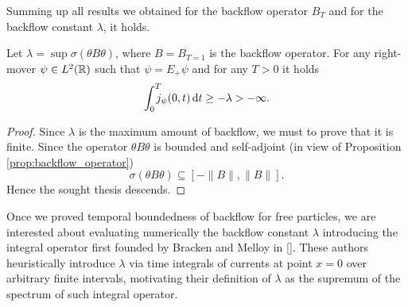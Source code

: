 Summing up all results we obtained for the backflow operator $B_T$ and for the backflow constant $\lambda$, it holds.

\begin{theorem}
	\label{th:temp_bound}
	Let $\lambda=\sup \sigma(\theta B\theta)$, where $B=B_{T=1}$ is the backflow operator. For any right-mover $\psi\in L^2({\mathbb R})$ such that $\psi=E_+\psi$ and for any $T>0$ it holds 
	\begin{equation}
		\int_{0}^{T}\!\!\!\!j_\psi(0,t)\, \mathrm d t\ge -\lambda>-\infty.
	\end{equation}
\end{theorem}
\begin{proof}
	Since $\lambda$ is the maximum amount of backflow, we must to prove that it is finite. Since the operator $\theta B\theta$ is bounded and self-adjoint (in view of Proposition \ref{prop:backflow_operator})
	\begin{equation}
		\sigma( \theta B\theta) \subseteq [-\|B\|,\|B\|].
	\end{equation}
	Hence the sought thesis descends.
\end{proof}

Once we proved temporal boundedness of backflow for free particles, we are interested about evaluating numerically the backflow constant $\lambda$ introducing the integral operator first founded by Bracken and Melloy in [\citealp{bracken}]. These authors heuristically introduce $\lambda$ via time integrals of currents at point $x = 0$ over arbitrary finite intervals, motivating their definition of $\lambda$ as the supremum of the spectrum of such integral operator.

